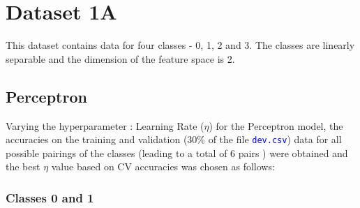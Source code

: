 \documentclass[11pt,a4paper]{article}
\def\colortt#1{\textcolor{blue}{\texttt{#1}}}
\begin{document}
{\hypersetup{linkcolor=black}
 \tableofcontents}
\break


\section{Dataset 1A}
This dataset contains data for four classes - 0, 1, 2 and 3. The classes are linearly separable and the dimension of the feature space is 2.
\subsection{Perceptron}
Varying the hyperparameter : Learning Rate ($\eta$) for the Perceptron model, the accuracies on the training and validation (30\% of the file \colortt{dev.csv}) data for all possible pairings of the classes (leading to a total of 6 pairs ) were obtained and the best $\eta$ value based on CV accuracies was chosen as follows:

\subsubsection{Classes 0 and 1}

\end{document}
